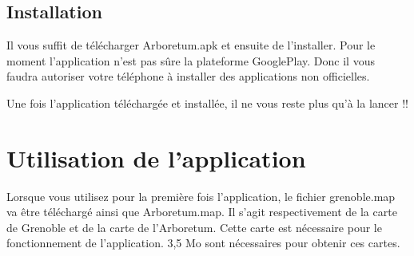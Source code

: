 \documentclass[a4paper,11pt]{article}
\begin{document}
   \subsection{Installation}
   Il vous suffit de télécharger Arboretum.apk et ensuite de l'installer. Pour le moment l'application n'est pas sûre la plateforme GooglePlay. Donc il 
   vous faudra autoriser votre téléphone à installer des applications non officielles.
   
   Une fois l'application téléchargée et installée, il ne vous reste plus qu'à la lancer !!
   
   \section{Utilisation de l'application}
       Lorsque vous utilisez pour la première fois l'application, le fichier grenoble.map va être téléchargé ainsi que Arboretum.map. Il s'agit respectivement de la
       carte de Grenoble et de la carte de l'Arboretum.
    Cette carte est nécessaire pour le fonctionnement de l'application. 3,5 Mo sont nécessaires pour obtenir ces cartes.
\end{document}
